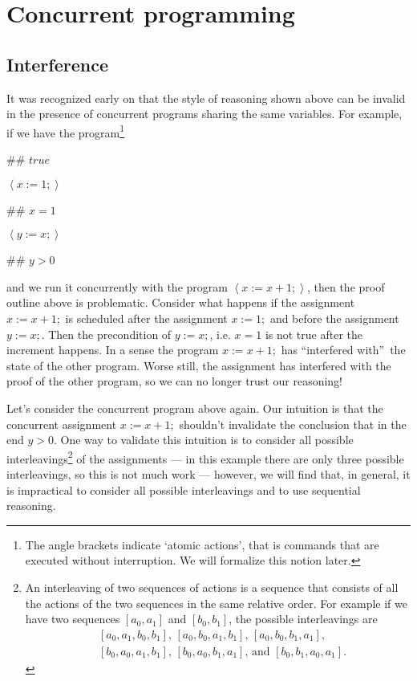 \documentclass[muchmore,11pt]{article}%
\begin{document}
\section{Concurrent programming\label{conc}}

\subsection{Interference}

It was recognized early on that the style of reasoning shown above can be
invalid in the presence of concurrent programs sharing the same variables. For
example, if we have the program\footnote{The angle brackets indicate `atomic
actions', that is commands that are executed without interruption. We will
formalize this notion later.}

\begin{code}
\#\# $\mathit{true}$

$\left\langle x:=1;\right\rangle $

\#\# $x=1$

$\left\langle y:=x;\right\rangle $

\#\# $y>0$
\end{code}

\noindent and we run it concurrently with the program $\left\langle
x:=x+1;\right\rangle $, then the proof outline above is problematic. Consider
what happens if the assignment $x:=x+1;$ is scheduled after the assignment
$x:=1;$ and before the assignment $y:=x;$. Then the precondition of $y:=x;$,
i.e. $x=1$ is not true after the increment happens. In a sense the program
$x:=x+1;$ has \textquotedblleft interfered with\textquotedblright\ the state
of the other program. Worse still, the assignment has interfered with the
proof of the other program, so we can no longer trust our reasoning!

Let's consider the concurrent program above again. Our intuition is that the
concurrent assignment $x:=x+1;$ shouldn't invalidate the conclusion that in
the end $y>0$. One way to validate this intuition is to consider all possible
interleavings\footnote{An interleaving of two sequences of actions is a
sequence that consists of all the actions of the two sequences in the same
relative order. For example if we have two sequences $\left[  a_{0}%
,a_{1}\right]  $ and $\left[  b_{0},b_{1}\right]  $, the possible
interleavings are
\begin{align*}
&  \left[  a_{0},a_{1},b_{0},b_{1}\right]  \text{, }\left[  a_{0},b_{0}%
,a_{1},b_{1}\right]  \text{, }\left[  a_{0},b_{0},b_{1},a_{1}\right]  \text{,
}\\
&  \left[  b_{0},a_{0},a_{1},b_{1}\right]  \text{, }\left[  b_{0},a_{0}%
,b_{1},a_{1}\right]  \text{, and }\left[  b_{0},b_{1},a_{0},a_{1}\right]  .
\end{align*}
} of the assignments --- in this example there are only three possible
interleavings, so this is not much work --- however, we will find that, in
general, it is impractical to consider all possible interleavings and to use
sequential reasoning.
\end{document}
